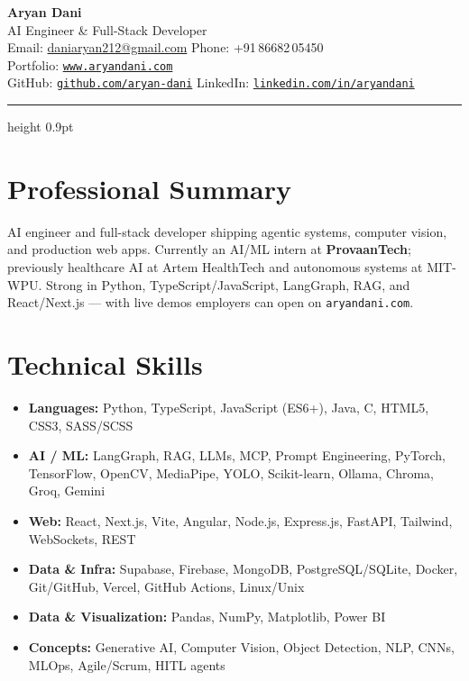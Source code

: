 \documentclass[a4paper,10pt]{article}
\newcommand{\sep}{\quad\textbullet\quad}
\begin{document}
\begin{center}
  {\Huge\bfseries Aryan Dani}\\[6pt]
  {\Large AI Engineer \& Full-Stack Developer}\\[5pt]
  Email: \href{mailto:daniaryan212@gmail.com}{daniaryan212@gmail.com}\sep
  Phone: +91\,86682\,05450\\[3pt]
  Portfolio: \texttt{\href{https://www.aryandani.com}{www.aryandani.com}}\\[2pt]
  GitHub: \texttt{\href{https://github.com/aryan-dani}{github.com/aryan-dani}}\sep
  LinkedIn: \texttt{\href{https://www.linkedin.com/in/aryandani/}{linkedin.com/in/aryandani}}
\end{center}

\vspace{8pt}
\hrule height 0.9pt
\vspace{8pt}

\section*{Professional Summary}
AI engineer and full-stack developer shipping agentic systems, computer vision, and production web apps.
Currently an AI/ML intern at \textbf{ProvaanTech}; previously healthcare AI at Artem HealthTech and autonomous systems at MIT-WPU.
Strong in Python, TypeScript/JavaScript, LangGraph, RAG, and React/Next.js --- with live demos employers can open on \texttt{aryandani.com}.

\section*{Technical Skills}
\begin{itemize}
  \item \textbf{Languages:} Python, TypeScript, JavaScript (ES6+), Java, C, HTML5, CSS3, SASS/SCSS
  \item \textbf{AI / ML:} LangGraph, RAG, LLMs, MCP, Prompt Engineering, PyTorch, TensorFlow, OpenCV, MediaPipe, YOLO, Scikit-learn, Ollama, Chroma, Groq, Gemini
  \item \textbf{Web:} React, Next.js, Vite, Angular, Node.js, Express.js, FastAPI, Tailwind, WebSockets, REST
  \item \textbf{Data \& Infra:} Supabase, Firebase, MongoDB, PostgreSQL/SQLite, Docker, Git/GitHub, Vercel, GitHub Actions, Linux/Unix
  \item \textbf{Data \& Visualization:} Pandas, NumPy, Matplotlib, Power BI
  \item \textbf{Concepts:} Generative AI, Computer Vision, Object Detection, NLP, CNNs, MLOps, Agile/Scrum, HITL agents
\end{itemize}
\end{document}
